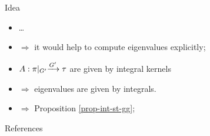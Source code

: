 \documentclass[pdf,notes]{beamer}
\renewcommand{\implies}{\Rightarrow}
\begin{document}
\begin{frame}{Idea}
	\begin{itemize}%
		\item \ldots
		\item $\implies$ it would help to compute eigenvalues explicitly;
		\item $\mysbo$ are given by integral kernels 
		\item $\implies$ eigenvalues are given by integrals.
		\item $\implies$ Proposition \ref{prop-int-st-gg};
	\end{itemize}
\end{frame}
\begin{frame}[allowframebreaks]{References}
	
	\nocite{Selberg:411367}
	\nocite{warnaar2010sl3}
	\nocite{dotsenko1985four}
	\nocite{tarasov2003selberg}

\end{frame}
\end{document}
